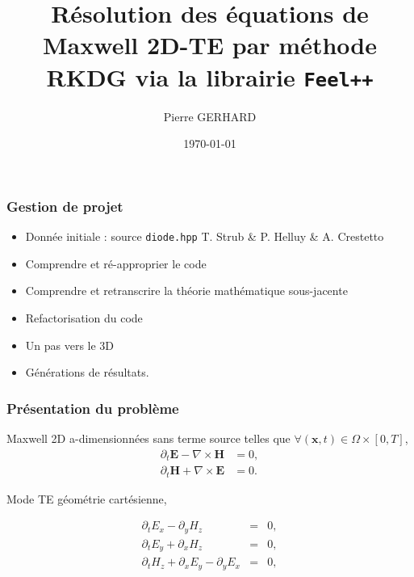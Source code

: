 \documentclass[9pt]{beamer}
\title{Résolution des équations de Maxwell 2D-TE par méthode RKDG via la librairie \texttt{Feel++}}
\institute{Université de Strasbourg}
\author{Pierre GERHARD}
\date\today
\begin{document}
\nocite{*}
\begin{frame}
\titlepage
\end{frame}


\begin{frame}
\frametitle{Gestion de projet}
\begin{itemize}
\item Donnée initiale : source \texttt{diode.hpp} T. Strub \& P. Helluy \& A. Crestetto
\item Comprendre et ré-approprier le code
\item Comprendre et retranscrire la théorie mathématique sous-jacente
\item Refactorisation du code
\item Un pas vers le 3D
\item Générations de résultats.
\end{itemize}
\end{frame}



\begin{frame}
\frametitle{Présentation du problème}
Maxwell 2D a-dimensionnées sans terme source telles que $\forall (\mathbf{x},t) \in \Omega \times [0,T]$,
\begin{equation}
\begin{aligned}
\label{eq:1}
\partial_t \mathbf{E} - \nabla \times \mathbf{H} &= 0,\\
\partial_t \mathbf{H} + \nabla \times \mathbf{E} &= 0.
\end{aligned}
\end{equation}

Mode TE géométrie cartésienne,

\begin{eqnarray}
\partial_t E_x - \partial_y H_z  &=& 0, \label{eq:2a}\\
\partial_t E_y + \partial_x H_z &=& 0, \label{eq:2b}\\
\partial_t H_z + \partial_x E_y - \partial_y E_x &=& 0, \label{eq:2c}
\end{eqnarray}

\end{frame}
\end{document}
